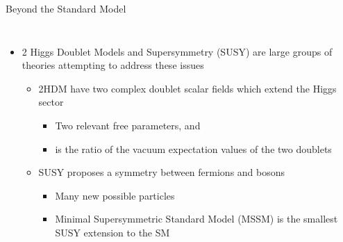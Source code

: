 \documentclass[aspectratio=169,xcolor=table]{beamer}
\begin{document}
    \begin{frame}[t]{Beyond the Standard Model}
      \begin{columns}[t]
        \begin{itemize}
          \item 2 Higgs Doublet Models and Supersymmetry (SUSY) are large groups of theories attempting to address these issues
          \begin{itemize}
            \item 2HDM have two complex doublet scalar fields which extend the Higgs sector \cite{2HDM}
            \begin{itemize}
              \item Two relevant free parameters, \mHpm and \tanb
              \item \tanb is the ratio of the vacuum expectation values of the two doublets
            \end{itemize}
            \item SUSY proposes a symmetry between fermions and bosons
              \begin{itemize}
                \item Many new possible particles
                \item Minimal Supersymmetric Standard Model (MSSM) is the smallest SUSY extension to the SM
              \end{itemize}
          \end{itemize}

\end{itemize}
\end{columns}
\end{frame}
\end{document}

